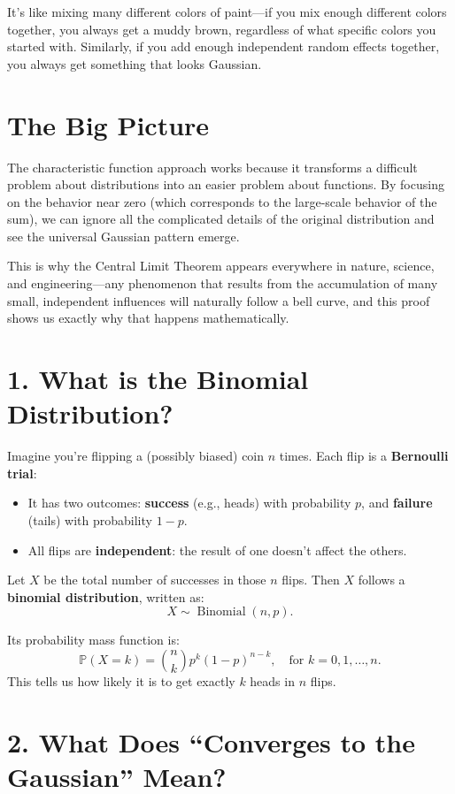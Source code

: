 \documentclass[12pt]{article}
\begin{document}
It's like mixing many different colors of paint---if you mix enough different colors together, you always get a muddy brown, regardless of what specific colors you started with. Similarly, if you add enough independent random effects together, you always get something that looks Gaussian.

\section*{The Big Picture}

The characteristic function approach works because it transforms a difficult problem about distributions into an easier problem about functions. By focusing on the behavior near zero (which corresponds to the large-scale behavior of the sum), we can ignore all the complicated details of the original distribution and see the universal Gaussian pattern emerge.

This is why the Central Limit Theorem appears everywhere in nature, science, and engineering---any phenomenon that results from the accumulation of many small, independent influences will naturally follow a bell curve, and this proof shows us exactly why that happens mathematically.



\section*{1. What is the Binomial Distribution?}

Imagine you’re flipping a (possibly biased) coin $n$ times. Each flip is a \textbf{Bernoulli trial}:
\begin{itemize}\item It has two outcomes: \textbf{success} (e.g., heads) with probability $p$, and \textbf{failure} (tails) with probability $1 - p$.
    \item All flips are \textbf{independent}: the result of one doesn’t affect the others.
\end{itemize}
Let $X$ be the total number of successes in those $n$ flips. Then $X$ follows a \textbf{binomial distribution}, written as:
\[
X \sim \operatorname{Binomial}(n, p).
\]

Its probability mass function is:
\[
\mathbb{P}(X = k) = \binom{n}{k} p^k (1 - p)^{n - k}, \quad \text{for } k = 0, 1, \dots, n.
\]
This tells us how likely it is to get exactly $k$ heads in $n$ flips.

\section*{2. What Does ``Converges to the Gaussian'' Mean?}
\end{document}

